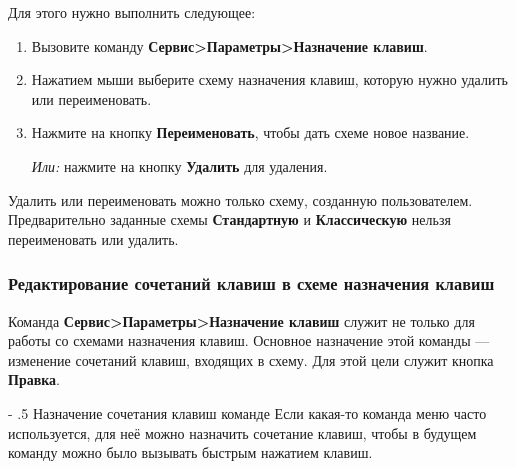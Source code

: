 ﻿\documentclass[a4paper,10pt]{article}
\makeatletter
\renewcommand\paragraph{%
   \@startsection{paragraph}{4}{0mm}%
      {-\baselineskip}%
      {.5\baselineskip}%
      {\normalfont\normalsize\bfseries}}
\makeatother
\begin{document}
 Для этого нужно выполнить следующее:
 
 \begin{enumerate}
  \item Вызовите команду \textbf{Сервис>Параметры>Назначение клавиш}.
  \item Нажатием мыши выберите схему назначения клавиш, которую нужно удалить или переименовать.
  \item Нажмите на кнопку \textbf{Переименовать}, чтобы дать схеме новое название.
  
  \textit{Или:} нажмите на кнопку \textbf{Удалить} для удаления.
 \end{enumerate}

 Удалить или переименовать можно только схему, созданную пользователем. Предварительно заданные схемы \textbf{Стандартную} и  \textbf{Классическую} нельзя переименовать или удалить.
 
 \subsubsection{Редактирование сочетаний клавиш в схеме назначения клавиш}
 Команда \textbf{Сервис>Параметры>Назначение клавиш} служит не только для работы со схемами назначения клавиш. Основное назначение этой команды —  изменение сочетаний клавиш, входящих в схему. Для этой цели служит кнопка \textbf{Правка}.
 
 \paragraph{Назначение сочетания клавиш команде}
 Если какая-то команда меню часто используется, для неё можно назначить сочетание клавиш, чтобы в будущем команду можно было вызывать быстрым нажатием клавиш.
 
\end{document}
